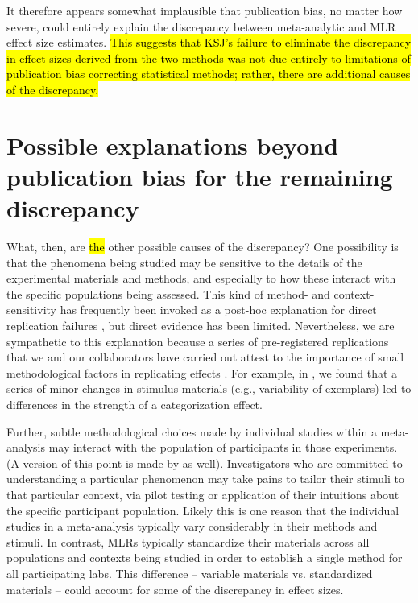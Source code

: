 \documentclass[man,floatsintext]{apa7}
\begin{document}
It therefore appears somewhat implausible that publication bias, no matter how severe, could entirely explain the discrepancy between meta-analytic and MLR effect size estimates. \hl{This suggests that KSJ's failure to eliminate the discrepancy in effect sizes derived from the two methods was not due entirely to limitations of publication bias correcting statistical methods; rather, there are additional causes of the discrepancy. }

\section{Possible explanations beyond publication bias for the remaining discrepancy}

What, then, are \hl{the} other possible causes of the discrepancy? One possibility is that the phenomena being studied may be sensitive to the details of the experimental materials and methods, and especially to how these interact with the specific populations being assessed. This kind of method- and context-sensitivity has frequently been invoked as a post-hoc explanation for direct replication failures \parencite{van2016contextual}, but direct evidence has been limited. Nevertheless, we are sympathetic to this explanation because a series of pre-registered replications that we and our collaborators have carried out attest to the importance of small methodological factors in replicating effects \parencite{lewis2018still,lewis2016understanding,phillips2015second}. For example, in \cite{lewis2016understanding}, we found that a series of minor changes in stimulus materials (e.g., variability of exemplars) led to differences in the strength of a categorization effect. 


Further, subtle methodological choices made by individual studies within a meta-analysis may interact with the population of participants in those experiments. (A version of this point is made by \cite{yarkoni2020} as well). Investigators who are committed to understanding a particular phenomenon may take pains to tailor their stimuli to that particular context, via pilot testing or application of their intuitions about the specific participant population. Likely this is one reason that the individual studies in a meta-analysis typically vary considerably in their methods and stimuli. In contrast, MLRs typically standardize their materials across all populations and contexts being studied in order to establish a single method for all participating labs. This difference -- variable materials vs. standardized materials -- could account for some of the discrepancy in effect sizes. 
\end{document}
